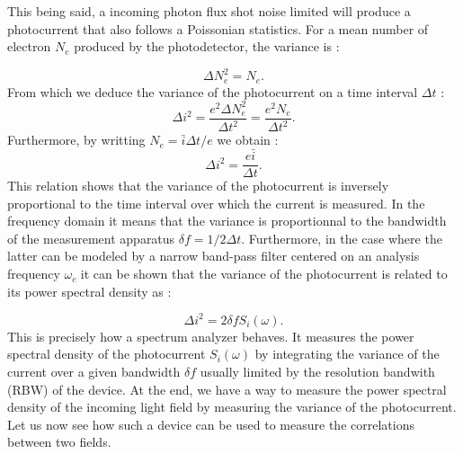 This being said, a incoming photon flux shot noise limited will produce a photocurrent that also follows a Poissonian statistics. For a mean number 
of electron $N_e$ produced by the photodetector, the variance is :

\begin{equation}
    \label{eq:n_e_variance}
    \Delta N_e^2 = N_e.
\end{equation}
From which we deduce the variance of the photocurrent on a time interval $\Delta t$ :
\begin{equation}
    \label{eq:photocurrent_variance}
    \Delta i^2 = \dfrac{e^2\Delta N_e^2}{\Delta t^2}=\dfrac{e^2N_e}{\Delta t^2}.
\end{equation}
Furthermore, by writting $N_e=\bar{i}\Delta t/e$ we obtain :
\begin{equation}
    \label{eq:photocurrent_variance2}
    \Delta i^2 = \dfrac{e\bar{i}}{\Delta t}.
\end{equation}
This relation shows that the variance of the photocurrent is inversely proportional to the time interval over which the current is measured. In the frequency
domain it means that the variance is proportionnal to the bandwidth of the measurement apparatus $\delta f=1/2\Delta t$. 
Furthermore, in the case where the latter can be modeled by a narrow band-pass filter centered on an analysis frequency $\omega_c$ it can be shown \cite{fabre_houches_97}
that the variance of the photocurrent is related to its power spectral density as :

\begin{equation}
    \label{eq:photocurrent_variance3}
    \Delta i^2 = 2\delta f S_i(\omega).
\end{equation}
This is precisely how a spectrum analyzer behaves. It measures the power spectral density of the photocurrent $S_i(\omega)$ by integrating the variance of the current over a given bandwidth $\delta f$ usually limited by the resolution 
bandwith (RBW) of the device.
At the end, we have a way to measure the power spectral density of the incoming light field by measuring the variance of the photocurrent. 
Let us now see how such a device can be used to measure the correlations between two fields.


